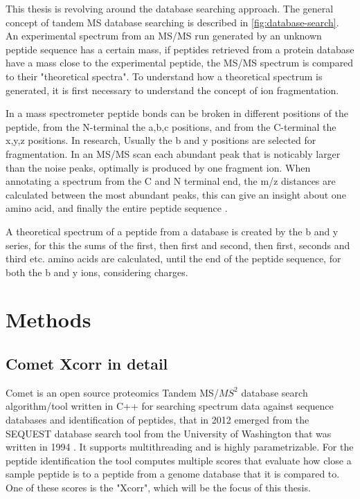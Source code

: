 \documentclass[11pt]{article}
\begin{document}
This thesis is revolving around the database searching approach. The general concept of tandem MS database searching is described in \cref{fig:database-search}. An experimental spectrum from an MS/MS run generated by an unknown peptide sequence has a certain mass, if peptides retrieved from a protein database have a mass close to the experimental peptide, the MS/MS spectrum is compared to their "theoretical spectra". To understand how a theoretical spectrum is generated, it is first necessary to understand the concept of ion fragmentation. 

In a mass spectrometer peptide bonds can be broken in different positions of the peptide, from the N-terminal the a,b,c positions, and from the C-terminal the x,y,z positions. In research, Usually the b and y positions are selected for fragmentation. In an MS/MS scan each abundant peak that is noticably larger than the noise peaks, optimally is produced by one fragment ion. When annotating a spectrum from the C and N terminal end, the m/z distances are calculated between the most abundant peaks, this can give an insight about one amino acid, and finally the entire peptide sequence \cite{b-y-ions}.

A theoretical spectrum of a peptide from a database is created by the b and y series, for this the sums of the first, then first and second, then first, seconds and third etc. amino acids are calculated, until the end of the peptide sequence, for both the b and y ions, considering charges.

\section{Methods}
\subsection{Comet Xcorr in detail}
Comet is an open source proteomics Tandem MS/\(MS^2\) database search algorithm/tool written in C++ for searching spectrum data against sequence databases and identification of peptides, that in 2012 emerged from the SEQUEST database search tool from the University of Washington that was written in 1994 \cite{comet-search-tool}. It supports multithreading and is highly parametrizable. For the peptide identification the tool computes multiple scores that evaluate how close a sample peptide is to a peptide from a genome database that it is compared to. One of these scores is the "Xcorr", which will be the focus of this thesis. 
\end{document}
